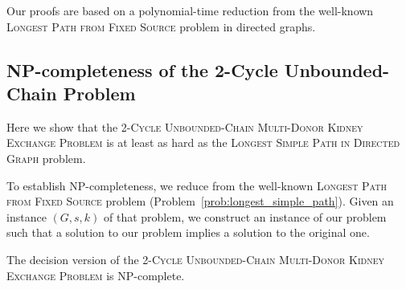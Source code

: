 Our proofs are based on a polynomial-time reduction from the well-known \textsc{Longest Path from Fixed Source} problem in directed graphs.

\subsection{NP-completeness of the 2-Cycle Unbounded-Chain Problem}

Here we show that the \textsc{2-Cycle Unbounded-Chain Multi-Donor Kidney Exchange Problem} is at least as hard as the \textsc{Longest Simple Path in Directed Graph} problem.

To establish NP-completeness, we reduce from the well-known \textsc{Longest Path from Fixed Source} problem (Problem~\ref{prob:longest_simple_path}). Given an instance $(G, s, k)$ of that problem, we construct an instance of our problem such that a solution to our problem implies a solution to the original one.

\begin{lemma}
The decision version of the \textsc{2-Cycle Unbounded-Chain Multi-Donor Kidney Exchange Problem} is NP-complete.
\end{lemma}

